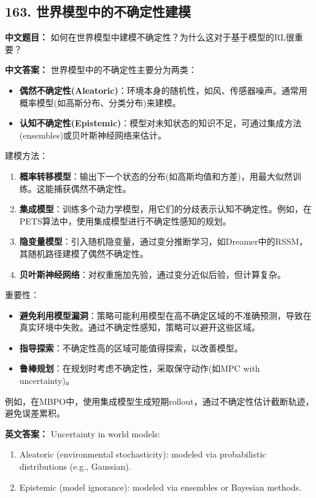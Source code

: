 \documentclass[10pt,a4paper]{ctexart}
\begin{document}
\subsection*{163. 世界模型中的不确定性建模}
\textbf{中文题目：} 如何在世界模型中建模不确定性？为什么这对于基于模型的RL很重要？

\textbf{中文答案：}  
世界模型中的不确定性主要分为两类：
\begin{itemize}
    \item \textbf{偶然不确定性(Aleatoric)}：环境本身的随机性，如风、传感器噪声。通常用概率模型(如高斯分布、分类分布)来建模。
    \item \textbf{认知不确定性(Epistemic)}：模型对未知状态的知识不足，可通过集成方法(ensembles)或贝叶斯神经网络来估计。
\end{itemize}

建模方法：
\begin{enumerate}
    \item \textbf{概率转移模型}：输出下一个状态的分布(如高斯均值和方差)，用最大似然训练。这能捕获偶然不确定性。
    \item \textbf{集成模型}：训练多个动力学模型，用它们的分歧表示认知不确定性。例如，在PETS算法中，使用集成模型进行不确定性感知的规划。
    \item \textbf{隐变量模型}：引入随机隐变量，通过变分推断学习，如Dreamer中的RSSM，其随机路径建模了偶然不确定性。
    \item \textbf{贝叶斯神经网络}：对权重施加先验，通过变分近似后验，但计算复杂。
\end{enumerate}

重要性：
\begin{itemize}
    \item \textbf{避免利用模型漏洞}：策略可能利用模型在高不确定区域的不准确预测，导致在真实环境中失败。通过不确定性感知，策略可以避开这些区域。
    \item \textbf{指导探索}：不确定性高的区域可能值得探索，以改善模型。
    \item \textbf{鲁棒规划}：在规划时考虑不确定性，采取保守动作(如MPC with uncertainty)。
\end{itemize}

例如，在MBPO中，使用集成模型生成短期rollout，通过不确定性估计截断轨迹，避免误差累积。

\textbf{英文答案：}  
Uncertainty in world models:
\begin{enumerate}
    \item Aleatoric (environmental stochasticity): modeled via probabilistic distributions (e.g., Gaussian).
    \item Epistemic (model ignorance): modeled via ensembles or Bayesian methods.
\end{enumerate}
\end{document}

